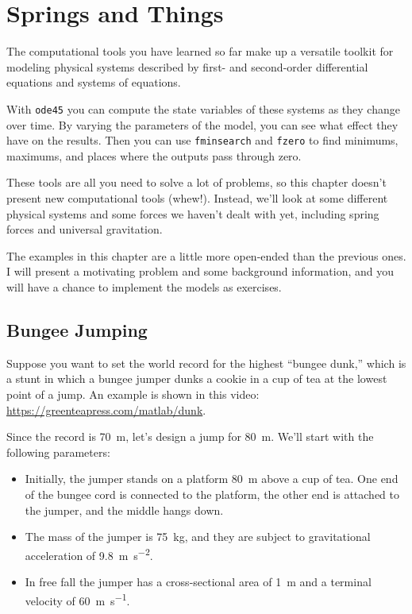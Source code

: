 \chapter{Springs and Things}

The computational tools you have learned so far make up a versatile toolkit for modeling physical systems described by first- and second-order differential equations and systems of equations.

With \lstinline{ode45} you can compute the state variables of these systems as they change over time.
By varying the parameters of the model, you can see what effect they have on the results.
Then you can use \lstinline{fminsearch} and \lstinline{fzero} to find minimums, maximums, and places where the outputs pass through zero.

These tools are all you need to solve a lot of problems, so this chapter doesn't present new computational tools (whew!).  Instead, we'll look at some different physical systems and some forces we haven't dealt with yet, including spring forces and universal gravitation.

The examples in this chapter are a little more open-ended than the previous ones.
I will present a motivating problem and some background information, and you will have a chance to implement the models as exercises.


\section{Bungee Jumping}
\label{bungee}


Suppose you want to set the world record for the highest ``bungee dunk,'' which is a stunt in which a bungee jumper dunks a cookie in a cup of tea at the lowest point of a jump.  An example is shown in this video: \url{https://greenteapress.com/matlab/dunk}.

Since the record is \SI{70}{\meter}, let's design a jump for \SI{80}{\meter}.  We'll start with the following parameters:

\begin{itemize}

\item  Initially, the jumper stands on a platform \SI{80}{\meter} above a cup of tea.  One end of the bungee cord is connected to the platform, the other end is attached to the jumper, and the middle hangs down.

\item The mass of the jumper is \SI{75}{\kilogram}, and they are subject to gravitational acceleration of \SI{9.8}{\meter \per \second \squared}.

\item In free fall the jumper has a cross-sectional area of \SI{1}{\meter} and a terminal velocity of \SI{60}{\meter\per\second}.

\end{itemize}

